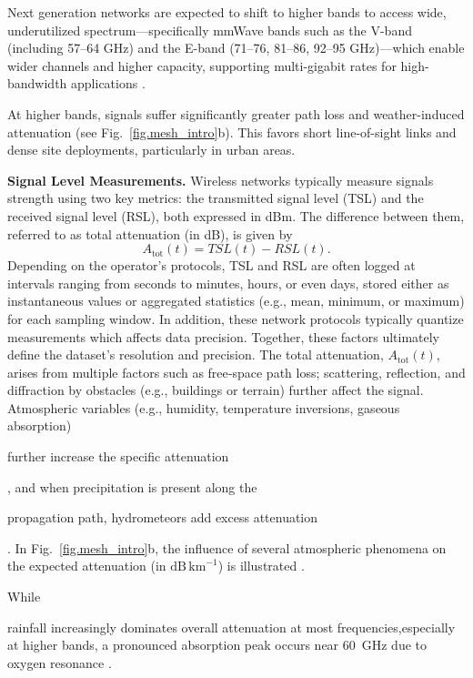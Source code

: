 \documentclass[manuscript]{copernicus}
\newif\ifshowrevisions
\newcommand{\blue}[1]{%
  \ifshowrevisions
    \textcolor{black}{#1}%
  \else
    #1%
  \fi
}
\begin{document}
\blue{Next generation networks are expected to shift to higher bands to access wide, underutilized spectrum—specifically mmWave bands such as the V-band (including 57–64 GHz) and the E-band (71–76, 81–86, 92–95 GHz)—which enable wider channels and higher capacity, supporting multi-gigabit rates for high-bandwidth applications \citep{ashraf20245g,brake20165g}.}
At higher bands, signals suffer significantly greater path loss and weather-induced attenuation (see Fig.~\ref{fig.mesh_intro}b). This favors short line-of-sight links and dense site deployments, particularly in urban areas.

\noindent \textbf{Signal Level Measurements.} Wireless networks typically measure signals strength using two key metrics: the transmitted signal level (TSL) and the received signal level (RSL), both expressed in dBm. The difference between them, referred to as total attenuation (in dB), is given by
\begin{equation} \label{eq.total_att}
    A_{\mathrm{tot}}(t) = TSL(t) - RSL(t).
\end{equation}
Depending on the operator’s protocols, TSL and RSL are often logged at intervals ranging 
from seconds to minutes, hours, or even days, stored either as instantaneous values or aggregated statistics (e.g., mean, minimum, or maximum) for each sampling window. In addition, these network protocols typically quantize measurements which affects data precision. Together, these factors ultimately define the dataset’s resolution and precision.
The total attenuation, $A_{\mathrm{tot}}(t)$, arises from multiple factors such as free‑space path loss; scattering, reflection, and diffraction by obstacles (e.g., buildings or terrain) further affect the signal.
Atmospheric variables (e.g., humidity, temperature inversions, gaseous absorption) \blue{further increase the specific attenuation}, and when precipitation is present along the \blue{propagation path, hydrometeors add excess attenuation}. 
In Fig.~\ref{fig.mesh_intro}b, the influence of several atmospheric phenomena on the expected attenuation (in $\mathrm{dB}\,\mathrm{km}^{-1}$) is illustrated \citep{ITU}. 
\blue{While} rainfall increasingly dominates overall attenuation at most frequencies,especially at higher bands, a pronounced absorption peak occurs near 60~GHz due to oxygen resonance \citep{arvas2019analysis}.

\end{document}
